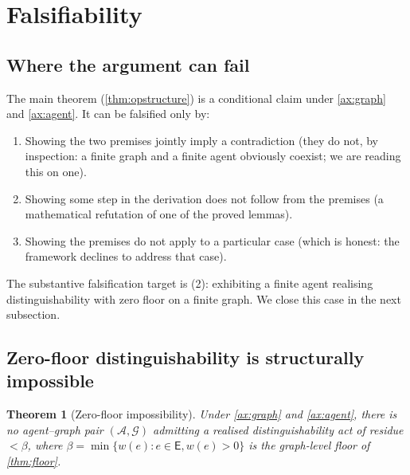\documentclass[11pt,twocolumn,a4paper]{article}
\theoremstyle{thmstyle}
\newtheorem{theorem}{Theorem}[section]
\theoremstyle{definition}
\theoremstyle{remark}
\newcommand{\Graph}{\mathcal{G}}
\newcommand{\Edg}{\mathsf{E}}
\newcommand{\Agent}{\mathcal{A}}
\newcommand{\floor}{\beta}
\begin{document}
\section{Falsifiability}
\label{sec:falsifiability}

\subsection{Where the argument can fail}

The main theorem (\cref{thm:opstructure}) is a conditional claim
under \cref{ax:graph} and \cref{ax:agent}. It can be falsified only
by:
\begin{enumerate}[nosep,leftmargin=*]
\item Showing the two premises jointly imply a contradiction (they
do not, by inspection: a finite graph and a finite agent obviously
coexist; we are reading this on one).
\item Showing some step in the derivation does not follow from the
premises (a mathematical refutation of one of the proved lemmas).
\item Showing the premises do not apply to a particular case (which
is honest: the framework declines to address that case).
\end{enumerate}

The substantive falsification target is (2): exhibiting a finite
agent realising distinguishability with zero floor on a finite
graph. We close this case in the next subsection.

\subsection{Zero-floor distinguishability is structurally impossible}

\begin{theorem}[Zero-floor impossibility]
\label{thm:zero_floor}
Under \cref{ax:graph} and \cref{ax:agent}, there is no agent--graph
pair $(\Agent, \Graph)$ admitting a realised distinguishability
act of residue $< \floor$, where $\floor = \min\{w(e) : e \in \Edg,
w(e) > 0\}$ is the graph-level floor of \cref{thm:floor}.
\end{theorem}
\end{document}
